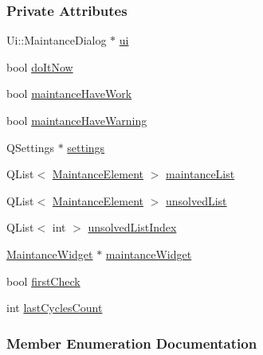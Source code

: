 \subsubsection*{Private Attributes}
\begin{DoxyCompactItemize}
\item 
Ui\+::\+Maintance\+Dialog $\ast$ \mbox{\hyperlink{classMaintanceDialog_aee97dd9f83af9508fb0ed3ac2de6ba87}{ui}}
\item 
bool \mbox{\hyperlink{classMaintanceDialog_ae23009895f32bfffb43f5ed93188be45}{do\+It\+Now}}
\item 
bool \mbox{\hyperlink{classMaintanceDialog_aea111f8bf60829f66b3f93c842512dea}{maintance\+Have\+Work}}
\item 
bool \mbox{\hyperlink{classMaintanceDialog_afe855bd63066dc98f09758b7cd6d9b53}{maintance\+Have\+Warning}}
\item 
Q\+Settings $\ast$ \mbox{\hyperlink{classMaintanceDialog_ad41c158948e59029193b28d4e3ab309e}{settings}}
\item 
Q\+List$<$ \mbox{\hyperlink{classMaintanceElement}{Maintance\+Element}} $>$ \mbox{\hyperlink{classMaintanceDialog_ac4eade50e2d9071c65adf44a2987fab1}{maintance\+List}}
\item 
Q\+List$<$ \mbox{\hyperlink{classMaintanceElement}{Maintance\+Element}} $>$ \mbox{\hyperlink{classMaintanceDialog_a37e3caf05435d01f47ed488c39a91587}{unsolved\+List}}
\item 
Q\+List$<$ int $>$ \mbox{\hyperlink{classMaintanceDialog_aae5f5335ab6b848ea0ff6254abbcece3}{unsolved\+List\+Index}}
\item 
\mbox{\hyperlink{classMaintanceWidget}{Maintance\+Widget}} $\ast$ \mbox{\hyperlink{classMaintanceDialog_a42a95d76614ce637c9b332ff996020e2}{maintance\+Widget}}
\item 
bool \mbox{\hyperlink{classMaintanceDialog_a27e8f4e6881da67cec3568a4a4b757a1}{first\+Check}}
\item 
int \mbox{\hyperlink{classMaintanceDialog_a615b6ffbbda8324d5225d286570f7f31}{last\+Cycles\+Count}}
\end{DoxyCompactItemize}


\subsubsection{Member Enumeration Documentation}
\mbox{\label{classMaintanceDialog_a0774fde5cbe916c333d8d1dd991a3b8f}} 
